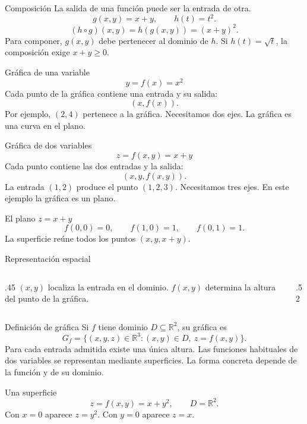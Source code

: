 \begin{frame}{Composición}
La salida de una función puede ser la entrada de otra.
\[g(x,y)=x+y,\qquad h(t)=t^2.\]
\[(h\circ g)(x,y)=h(g(x,y))=(x+y)^2.\]
Para componer, $g(x,y)$ debe pertenecer al dominio de $h$.
\medskip
Si $h(t)=\sqrt t$, la composición exige $x+y\ge0$.
\end{frame}
\begin{frame}{Gráfica de una variable}
\[y=f(x)=x^2\]
Cada punto de la gráfica contiene una entrada y su salida:
\[(x,f(x)).\]
Por ejemplo, $(2,4)$ pertenece a la gráfica.
\medskip
Necesitamos dos ejes. La gráfica es una curva en el plano.
\end{frame}
\begin{frame}{Gráfica de dos variables}
\[z=f(x,y)=x+y\]
Cada punto contiene las dos entradas y la salida:
\[(x,y,f(x,y)).\]
La entrada $(1,2)$ produce el punto $(1,2,3)$.
\medskip
Necesitamos tres ejes. En este ejemplo la gráfica es un plano.
\end{frame}
\begin{frame}{El plano $z=x+y$}
\[f(0,0)=0,\qquad f(1,0)=1,\qquad f(0,1)=1.\]
La superficie reúne todos los puntos $(x,y,x+y)$.
\end{frame}
\begin{frame}{Representación espacial}
\begin{columns}[c]
\begin{column}{.45\textwidth}
$(x,y)$ localiza la entrada en el dominio.
\medskip
$f(x,y)$ determina la altura del punto de la gráfica.
\end{column}
\begin{column}{.52\textwidth}\end{column}
\end{columns}
\end{frame}
\begin{frame}{Definición de gráfica}
Si $f$ tiene dominio $D\subseteq\mathbb R^2$, su gráfica es
\[G_f=\{(x,y,z)\in\mathbb R^3:(x,y)\in D,\ z=f(x,y)\}.\]
Para cada entrada admitida existe una única altura.
\medskip
Las funciones habituales de dos variables se representan mediante superficies. La forma concreta depende de la función y de su dominio.
\end{frame}
\begin{frame}{Una superficie}
\[z=f(x,y)=x+y^2,\qquad D=\mathbb R^2.\]
Con $x=0$ aparece $z=y^2$. Con $y=0$ aparece $z=x$.
\end{frame}
